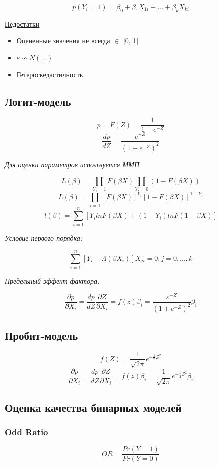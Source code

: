 \documentclass[a4paper, 12pt]{article}
\begin{document}
\[p(Y_{i} = 1) = \beta_{0} + \beta_{1}X_{1i} + ... + \beta_{k}X_{ki}\]

\underline{Недостатки}
\begin{itemize}
    \item Оцененные значения не всегда $\in$ [0, 1]
    \item $\varepsilon \nsim N(...)$
    \item Гетероскедастичность
\end{itemize}

\subsection{Логит-модель}

\[p = F(Z) = \frac{1}{1 + e^{-Z}}\]
\[\frac{dp}{dZ} = \frac{e^{-Z}}{(1 + e^{-Z})^{2}}\]
\begin{center}
    \textit{Для оценки параметров используется ММП}
\end{center}
\[L(\beta) = \prod_{Y_{i} = 1}F(\beta X) \prod_{Y_{i}  = 0}(1 - F(\beta X))\]
\[L(\beta) = \prod_{i = 1}[F(\beta X)]^{Y_{i}}[1 - F(\beta X)]^{1 - Y_{i}}\]
\[l(\beta) = \sum_{i = 1}^{n} [Y_{i}lnF(\beta X) + (1 - Y_{i})lnF(1 - \beta X)]\]
\begin{center}
    \textit{Условие первого порядка:}
\end{center}
\[\sum_{i = 1}^{n}[Y_{i} - \Lambda(\beta X_{i})]X_{ji} = 0, j = 0, ..., k\]

\begin{center}
    \textit{Предельный эффект фактора:}
\end{center}
\[\frac{\partial p}{\partial X_{i}} = \frac{dp}{dZ}\frac{\partial Z}{\partial X_{i}} = f(z)\beta_{i} = \frac{\varepsilon^{-Z}}{(1 + e^{-Z})^{2}}\beta_{i}\]

\subsection{Пробит-модель}

\[f(Z) = \frac{1}{\sqrt{2\pi}}e^{-\frac{1}{2}Z^{2}}\]
\[\frac{\partial p}{\partial X_{i}} = \frac{dp}{dZ}\frac{\partial Z}{\partial X_{i}} = f(z)\beta_{i} = \frac{1}{\sqrt{2\pi}}e^{-\frac{1}{2}Z^{2}}\beta_{i}\]

\subsection{Оценка качества бинарных моделей}

\subsubsection{Odd Ratio}
\[OR = \frac{Pr(Y = 1)}{Pr(Y = 0)}\]
\end{document}
